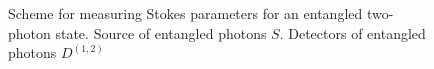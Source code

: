 \begin{figure}
\centering


\caption{Scheme for measuring Stokes parameters for an entangled
  two-photon state. Source of entangled photons $S$.
  Detectors of entangled photons $D^{(1,2)}$}
\label{figEntangMes}
\end{figure}